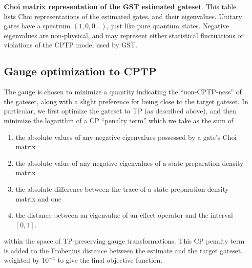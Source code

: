 {\begin{table}[h]
\begin{center}
\caption{\textbf{Choi matrix representation of the GST estimated gateset}.  This table lists Choi representations of the estimated gates, and their eigenvalues.  Unitary gates have a spectrum $(1,0,0\ldots)$, just like pure quantum states.  Negative eigenvalues are non-physical, and may represent either statistical fluctuations or violations of the CPTP model used by GST.\label{bestTPGatesetChoiTable}}
\end{center}
\end{table}

\clearpage

\subsection{Gauge optimization to CPTP}
The gauge is chosen to minimize a quantity indicating the ``non-CPTP-ness'' of the gateset, along with a slight preference for being close to the target gateset.  In particular, we first optimize the gateset to TP (as described above), and then minimize the logarithm of a CP ``penalty term'' which we take as the sum of
\begin{enumerate}
\item the absolute values of any negative eigenvalues possessed by a gate's Choi matrix
\item the absolute value of any negative eigenvalues of a state preparation density matrix
\item the absolute difference between the trace of a state preparation density matrix and one
\item the distance between an eigenvalue of an effect operator and the interval $[0,1]$.
\end{enumerate}
within the space of TP-preserving gauge transformations.  This CP penalty term is added to the Frobenius distance between the estimate and the target gateset, weighted by $10^{-4}$ to give the final objective function.

}
